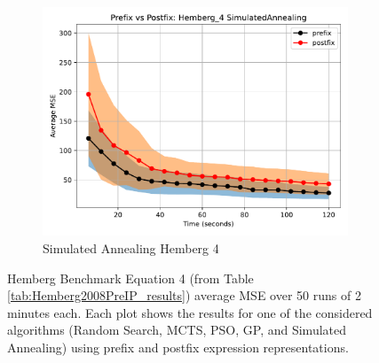 \documentclass[runningheads]{llncs}
\begin{document}
\begin{figure}
    \vspace{0.5cm}
    
    \begin{subfigure}[b]{0.4\textwidth}
        \includegraphics[width=\linewidth, keepaspectratio]{Hemberg_Benchmarks/PrePostHemberg_4SimulatedAnnealing.pdf}
        \caption{Simulated Annealing Hemberg 4}
        \label{subfig:hemberg_4_SA}
    \end{subfigure}
    
    \caption{Hemberg Benchmark Equation 4 (from Table \ref{tab:Hemberg2008PreIP_results}) average MSE over 50 runs of 2 minutes each. Each plot shows the results for one of the considered algorithms (Random Search, MCTS, PSO, GP, and Simulated Annealing) using prefix and postfix expression representations.}
    \label{fig:Hemberg_4_Benchmarks}
\end{figure}
\end{document}
